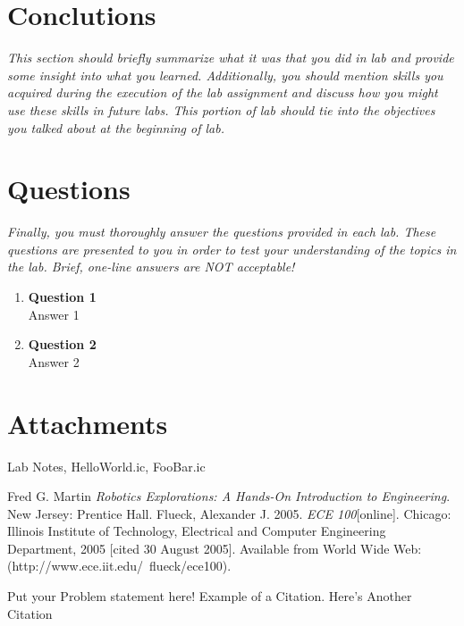 \documentclass[titlepage]{article}
\begin{document}
\section*{Conclutions}

\textit{This section should briefly summarize what it was that you did in lab
and provide some insight into what you learned. Additionally, you should mention
 skills you acquired during the execution of the lab assignment and discuss how
 you might use these skills in future labs. This portion of lab should tie into
 the objectives you talked about at the beginning of lab.}

\section*{Questions}

\textit{Finally, you must thoroughly answer the questions provided in each lab.
These questions are presented to you in order to test your understanding of the
topics in the lab. Brief, one-line answers are NOT acceptable!}

\begin{enumerate}
  \item \textbf{Question 1} \\
    Answer 1
  \item \textbf{Question 2} \\
    Answer 2
\end{enumerate}

\section*{Attachments}
Lab Notes, HelloWorld.ic, FooBar.ic

\begin{thebibliography}{9}
 Fred G. Martin \emph{Robotics Explorations: A Hands-On Introduction to Engineering}. New Jersey: Prentice Hall.
  Flueck, Alexander J. 2005. \emph{ECE 100}[online]. Chicago: Illinois Institute of Technology, Electrical and Computer Engineering Department, 2005 [cited 30
August 2005]. Available from World Wide Web: (http://www.ece.iit.edu/~flueck/ece100).
\end{thebibliography}

Put your Problem statement here! Example of a Citation\cite[p.219]{Robotics}. Here's Another Citation\cite{Flueck}
\fi
\end{document}

